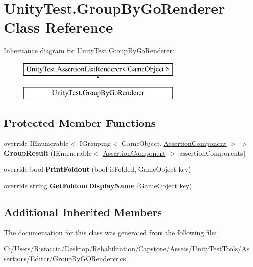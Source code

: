 \hypertarget{class_unity_test_1_1_group_by_go_renderer}{}\section{Unity\+Test.\+Group\+By\+Go\+Renderer Class Reference}
\label{class_unity_test_1_1_group_by_go_renderer}
Inheritance diagram for Unity\+Test.\+Group\+By\+Go\+Renderer\+:\begin{figure}[H]
\begin{center}
\leavevmode
\includegraphics[height=2.000000cm]{class_unity_test_1_1_group_by_go_renderer}
\end{center}
\end{figure}
\subsection*{Protected Member Functions}
\begin{DoxyCompactItemize}
\item 
\mbox{\label{class_unity_test_1_1_group_by_go_renderer_a309262e14672e2a5dac18cf5d4e16a2f}} 
override I\+Enumerable$<$ I\+Grouping$<$ Game\+Object, \hyperlink{class_unity_test_1_1_assertion_component}{Assertion\+Component} $>$ $>$ {\bfseries Group\+Result} (I\+Enumerable$<$ \hyperlink{class_unity_test_1_1_assertion_component}{Assertion\+Component} $>$ assertion\+Components)
\item 
\mbox{\label{class_unity_test_1_1_group_by_go_renderer_ac78761f6270f5f5222f013bc8c78ab9c}} 
override bool {\bfseries Print\+Foldout} (bool is\+Folded, Game\+Object key)
\item 
\mbox{\label{class_unity_test_1_1_group_by_go_renderer_ad6c9105c678eafff676a498f3d07fae4}} 
override string {\bfseries Get\+Foldout\+Display\+Name} (Game\+Object key)
\end{DoxyCompactItemize}
\subsection*{Additional Inherited Members}


The documentation for this class was generated from the following file\+:\begin{DoxyCompactItemize}
\item 
C\+:/\+Users/\+Ristaccia/\+Desktop/\+Rehabilitation/\+Capstone/\+Assets/\+Unity\+Test\+Tools/\+Assertions/\+Editor/Group\+By\+G\+O\+Renderer.\+cs\end{DoxyCompactItemize}
